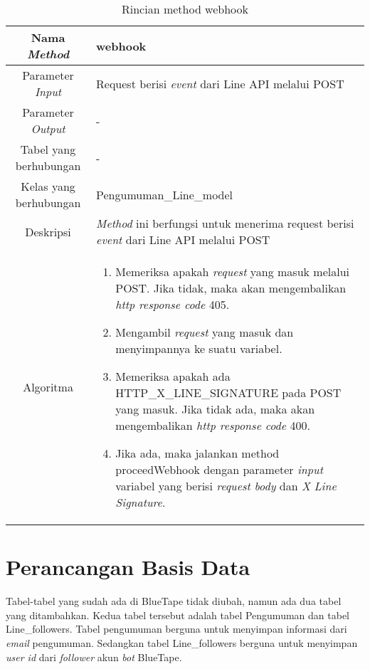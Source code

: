 \begin{center}
	\begin{table}[H]
	\caption{Rincian method webhook}
	\label{table:pengumumanline-webhook}
\begin{tabular}{|c|p{11cm}|}
\hline
Nama \textit{Method} 	& 	 webhook	\\
\hline
Parameter \textit{Input} & Request berisi \textit{event} dari Line API melalui POST \\
\hline
Parameter \textit{Output} & - \\
\hline
Tabel yang berhubungan & -\\
\hline
Kelas yang berhubungan & Pengumuman\_Line\_model \\
\hline
Deskripsi	& \textit{Method} ini berfungsi untuk menerima request berisi \textit{event} dari Line API melalui POST\\
\hline
Algoritma	& \begin{enumerate}
				\item Memeriksa apakah \textit{request} yang masuk melalui POST. Jika tidak, maka akan mengembalikan \textit{http response code} 405.
				\item Mengambil \textit{request} yang masuk dan menyimpannya ke suatu variabel.
				\item Memeriksa apakah ada HTTP\_X\_LINE\_SIGNATURE pada POST yang masuk. Jika tidak ada, maka akan mengembalikan \textit{http response code} 400.
				\item Jika ada, maka jalankan method proceedWebhook dengan parameter \textit{input} variabel yang berisi \textit{request body} dan \textit{X Line Signature}.
				\end{enumerate} \\
\hline
\end{tabular}
\end{table}
\end{center}

\section{Perancangan Basis Data}
Tabel-tabel yang sudah ada di BlueTape tidak diubah, namun ada dua tabel yang ditambahkan. Kedua tabel tersebut adalah tabel Pengumuman dan tabel Line\_followers. Tabel pengumuman berguna untuk menyimpan informasi dari \textit{email} pengumuman. Sedangkan tabel Line\_followers berguna untuk menyimpan \textit{user id} dari \textit{follower} akun \textit{bot} BlueTape.

